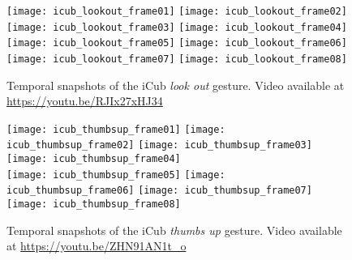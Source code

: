 \begin{figure}
\centering
\subfloat
{\texttt{[image: icub\_lookout\_frame01]}} \quad
%
\subfloat
{\texttt{[image: icub\_lookout\_frame02]}} \quad
%
\subfloat
{\texttt{[image: icub\_lookout\_frame03]}} \quad
%
\subfloat
{\texttt{[image: icub\_lookout\_frame04]}} \\
%
\subfloat
{\texttt{[image: icub\_lookout\_frame05]}} \quad
%
\subfloat
{\texttt{[image: icub\_lookout\_frame06]}} \quad
%
\subfloat
{\texttt{[image: icub\_lookout\_frame07]}} \quad
%
\subfloat
{\texttt{[image: icub\_lookout\_frame08]}}
\caption[Temporal snapshots of the iCub \emph{look out} gesture.]{Temporal snapshots of the iCub \emph{look out} gesture. Video available at \url{https://youtu.be/RJIx27xHJ34}}
\label{fig:lookout}
\end{figure}

\begin{figure}
\centering
\subfloat
{\texttt{[image: icub\_thumbsup\_frame01]}} \quad
%
\subfloat
{\texttt{[image: icub\_thumbsup\_frame02]}} \quad
%
\subfloat
{\texttt{[image: icub\_thumbsup\_frame03]}} \quad
%
\subfloat
{\texttt{[image: icub\_thumbsup\_frame04]}} \\
%
\subfloat
{\texttt{[image: icub\_thumbsup\_frame05]}} \quad
%
\subfloat
{\texttt{[image: icub\_thumbsup\_frame06]}} \quad
%
\subfloat
{\texttt{[image: icub\_thumbsup\_frame07]}} \quad
%
\subfloat
{\texttt{[image: icub\_thumbsup\_frame08]}}
\caption[Temporal snapshots of the iCub \emph{thumbs up} gesture.]{Temporal snapshots of the iCub \emph{thumbs up} gesture. Video available at \url{https://youtu.be/ZHN91AN1t_o}}
\label{fig:thumbsup}
\end{figure}

